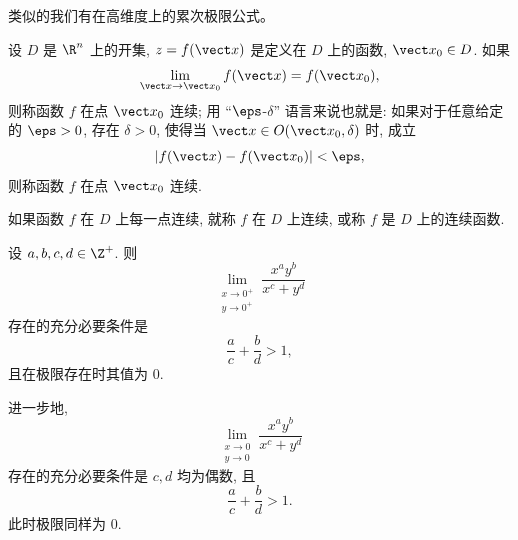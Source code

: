 类似的我们有在高维度上的累次极限公式。
\begin{definition}
	设 $D$ 是 $\R^n$ 上的开集, $z = f(\vect x)$ 是定义在 $D$ 上的函数, $\vect x_0 \in D$. 如果
	\[
	\lim_{\vect x \to \vect x_0} f(\vect x) = f(\vect x_0),
	\]
	则称函数 $f$ 在点 $\vect x_0$ 连续; 用 ``$\eps$-$\delta$'' 语言来说也就是: 如果对于任意给定的 $\eps > 0$, 存在 $\delta > 0$, 使得当 $\vect x \in O(\vect x_0, \delta)$ 时, 成立
	\[
	|f(\vect x) - f(\vect x_0)| < \eps,
	\]
	则称函数 $f$ 在点 $\vect x_0$ 连续.

	如果函数 $f$ 在 $D$ 上每一点连续, 就称 $f$ 在 $D$ 上连续, 或称 $f$ 是 $D$ 上的连续函数.
\end{definition}
\begin{proposition}
	设 $a,b,c,d\in\Z^+$. 则
	\[
	\lim_{\substack{x\to0^+\\y\to0^+}}
	\frac{x^ay^b}{x^c+y^d}
	\]
	存在的充分必要条件是
	\[
	\frac{a}{c}+\frac{b}{d}>1,
	\]
	且在极限存在时其值为 $0$.
	
	进一步地,
	\[
	\lim_{\substack{x\to0\\y\to0}}
	\frac{x^ay^b}{x^c+y^d}
	\]
	存在的充分必要条件是 $c,d$ 均为偶数, 且
	\[
	\frac{a}{c}+\frac{b}{d}>1.
	\]
	此时极限同样为 $0$.
\end{proposition}

